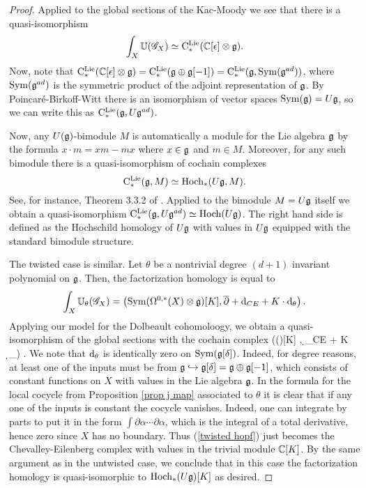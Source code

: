 \begin{proof}
Applied to the global sections of the Kac-Moody we see that there is a quasi-isomorphism
\[
\int_X \mathbb U(\mathscr G_X) \simeq {\rm C}^{\rm Lie}_*(\mathbb C[\epsilon] \otimes \mathfrak g) .
\]
Now, note that ${\rm C}^{\rm Lie}_*(\mathbb C[\epsilon] \otimes \mathfrak g) = {\rm C}^{\rm Lie}_*(\mathfrak g \oplus \mathfrak g[-1]) = {\rm C}^{\rm Lie}_*(\mathfrak g, {\rm Sym} (\mathfrak g^{ad}))$, where ${\rm Sym}(\mathfrak g^{ad})$ is the symmetric product of the adjoint representation of $\mathfrak g$. 
By Poincar\'{e}-Birkoff-Witt there is an isomorphism of vector spaces ${\rm Sym}(\mathfrak g) = U \mathfrak g$, so we can write this as ${\rm C}^{\rm Lie}_*(\mathfrak g, U \mathfrak g^{ad})$.

Now, any $U(\mathfrak g)$-bimodule $M$ is automatically a module for the Lie algebra $\mathfrak g$ by the formula $x \cdot m = xm - mx$ where $x \in \mathfrak g$ and $m \in M$.
Moreover, for any such bimodule there is a quasi-isomorphism of cochain complexes 
\[
{\rm C}^{\rm Lie}_*(\mathfrak g, M) \simeq {\rm Hoch}_*(U\mathfrak g, M) .
\]
See, for instance, Theorem 3.3.2 of \cite{LodayCyclic}.
Applied to the bimodule $M = U\mathfrak g$ itself we obtain a quasi-isomorphism ${\rm C}^{\rm Lie}_*(\mathfrak g , U\mathfrak g^{ad}) \simeq {\rm Hoch}(U\mathfrak g)$.
The right hand side is defined as the Hochschild homology of $U\mathfrak g$ with values in $U\mathfrak g$ equipped with the standard bimodule structure. 

The twisted case is similar. 
Let $\theta$ be a nontrivial degree $(d+1)$ invariant polynomial on $\mathfrak g$. 
Then, the factorization homology is equal to
\[
\int_X \mathbb U_\theta (\mathscr G_X) = \left({\rm Sym}(\Omega^{0,*}(X) \otimes \mathfrak g)[K] , \overline{\partial} + {\rm d}_{CE} + K \cdot {\rm d}_\theta\right) .
\]
Applying our model for the Dolbeault cohomoloogy, we obtain a quasi-isomorphism of the global sections with the cochain complex
\beqn\label{twisted hopf}
\left(\Sym(\fg[\delta])[K] ,  \d_{CE} + K \cdot \d_\theta \right) .
\eeqn
We note that ${\rm d}_\theta$ is identically zero on ${\rm Sym}(\mathfrak g[\delta])$. 
Indeed, for degree reasons, at least one of the inputs must be from $\mathfrak g \hookrightarrow \mathfrak g[\delta] = \mathfrak g \oplus \mathfrak g[-1]$, which consists of constant functions on $X$ with values in the Lie algebra $\mathfrak g$. 
In the formula for the local cocycle from Proposition \ref{prop j map} associated to $\theta$ it is clear that if any one of the inputs is constant the cocycle vanishes. 
Indeed, one can integrate by parts to put it in the form $\int \partial \alpha \cdots \partial \alpha$, which is the integral of a total derivative, hence zero since $X$ has no boundary.
Thus (\ref{twisted hopf}) just becomes the Chevalley-Eilenberg complex with values in the trivial module $\mathbb C[K]$. 
By the same argument as in the untwisted case, we conclude that in this case the factorization homology is quasi-isomorphic to ${\rm Hoch}_*(U \mathfrak g)[K]$ as desired.
\end{proof}


